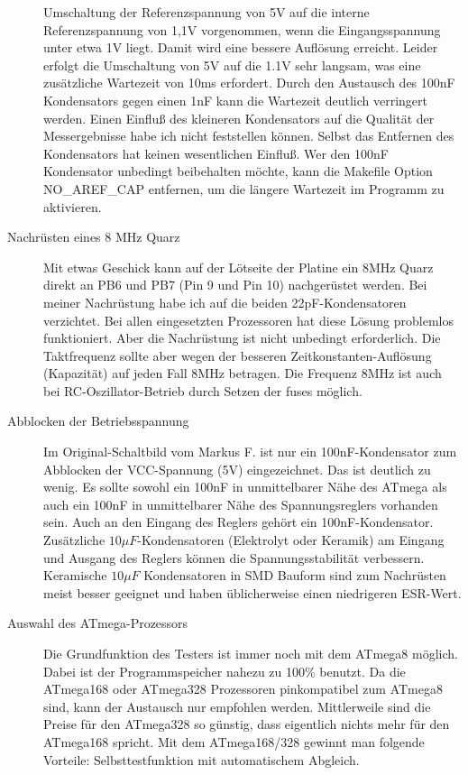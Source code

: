 \begin{description}
Umschaltung der Referenzspannung von 5V auf die interne Referenzspannung von 1,1V vorgenommen,
wenn die Eingangsspannung unter etwa 1V liegt. Damit wird eine bessere Auflösung erreicht.
Leider erfolgt die Umschaltung von 5V auf die 1.1V sehr langsam, was eine zusätzliche
Wartezeit von 10ms erfordert. Durch den Austausch des 100nF Kondensators gegen einen 1nF
kann die Wartezeit deutlich verringert werden. Einen Einfluß des kleineren Kondensators
auf die Qualität der Messergebnisse habe ich nicht feststellen können. Selbst das Entfernen
des Kondensators hat keinen wesentlichen Einfluß. Wer den 100nF Kondensator unbedingt
beibehalten möchte, kann die Makefile Option NO\_AREF\_CAP entfernen, um die längere
Wartezeit im Programm zu aktivieren.
\item[Nachrüsten eines 8 MHz Quarz]
Mit etwas Geschick kann auf der Lötseite der Platine ein 8MHz Quarz direkt an PB6 und PB7
(Pin 9 und Pin 10) nachgerüstet werden.
Bei meiner Nachrüstung habe ich auf die beiden 22pF-Kondensatoren verzichtet.
Bei allen eingesetzten Prozessoren hat diese Lösung problemlos funktioniert.
Aber die Nachrüstung ist nicht unbedingt erforderlich. Die Taktfrequenz sollte aber
wegen der besseren Zeitkonstanten-Auflösung (Kapazität) auf jeden Fall 8MHz betragen.
Die Frequenz 8MHz ist auch bei RC-Oszillator-Betrieb durch Setzen der fuses möglich.
\item[Abblocken der Betriebsspannung]
Im Original-Schaltbild vom Markus F. ist nur ein 100nF-Kondensator zum Abblocken der
VCC-Spannung (5V) eingezeichnet. Das ist deutlich zu wenig. Es sollte sowohl ein
100nF in unmittelbarer Nähe des ATmega als auch ein 100nF in unmittelbarer Nähe
des Spannungsreglers vorhanden sein. Auch an den Eingang des Reglers gehört ein
100nF-Kondensator. Zusätzliche \(10\mu F\)-Kondensatoren (Elektrolyt oder Keramik) am Eingang und
Ausgang des Reglers können die Spannungsstabilität verbessern. Keramische \(10\mu F\)
Kondensatoren in SMD Bauform sind zum Nachrüsten meist besser geeignet und
haben üblicherweise einen niedrigeren ESR-Wert.
\item[Auswahl des ATmega-Prozessors]
Die Grundfunktion des Testers ist immer noch mit dem ATmega8 möglich.
Dabei ist der Programmspeicher nahezu zu 100\% benutzt.
Da die ATmega168 oder ATmega328 Prozessoren pinkompatibel zum ATmega8 sind,
kann der Austausch nur empfohlen werden. Mittlerweile sind die Preise für
den ATmega328 so günstig, dass eigentlich nichts mehr für den ATmega168 spricht.
Mit dem ATmega168/328 gewinnt man folgende Vorteile:
Selbsttestfunktion mit automatischem Abgleich.\\

\end{description}

